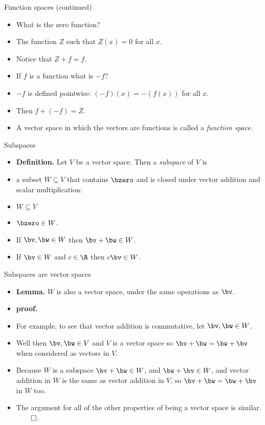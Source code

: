 \documentclass{beamer}
\begin{document}
\begin{frame}{Function spaces (continued)}

\begin{itemize}
\item What is the zero function?
\item The function $Z$ such that $Z(x) = 0$ for all $x$.
\item Notice that $Z + f = f$.
\item If $f$ is a function what is $-f$?
\item $-f$ is defined pointwise: $(-f)(x)  = -(f(x))$ for all $x$.
\item Then $f+(-f) = Z$.
\item A vector space in which the vectors are functions is called
a \emph{function space.}
\end{itemize}
\end{frame}

\begin{frame}{Subspaces}

\begin{itemize}
\item \textbf{Definition.} Let $V$ be a vector space. Then a \emph{subspace}
of $V$ is
\item  a subset $W\subseteq V$ that contains $\bzero$ and is closed
under vector addition and scalar multiplication:
\item $W\subseteq V$
\item $\bzero \in W$.
\item If $\bv,\bw\in W$ then $\bv+\bw\in W$.
\item If $\bv\in W$ and $c\in \R$ then $c\bv\in W$.
\end{itemize}
\end{frame}

\begin{frame}{Subspaces are vector spaces}

\begin{itemize}
\item \textbf{Lemma.} $W$ is also a vector space, under the same operations
as $\bv$.
\item \textbf{proof.}
\item For example, to see that vector addition is commutative, let
$\bv,\bw\in W$.
\item Well then $\bv,\bw\in V$ and $V$ is a vector space so $\bv+\bw=\bw+\bv$
when considered as vectors in $V$.
\item Because $W$ is a subspace $\bv + \bw\in W$, and $\bw + \bv\in W$,
and vector addition in $W$ is the same as vector addition in $V$, so
$\bv+\bw=\bw+\bv$ in $W$ too.
\item The argument for all of the other properties of being a vector space
is similar. $\qed$.
\end{itemize}
\end{frame}
\end{document}
